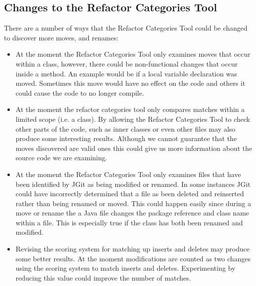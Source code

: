 \subsection{Changes to the Refactor Categories Tool}

There are a number of ways that the Refactor Categories Tool could be changed to discover more moves, and renames:

\begin{itemize}

  \item At the moment the Refactor Categories Tool only examines moves that occur within a class, however, there could be non-functional changes that occur inside a method. 
An example would be if a local variable declaration was moved.
Sometimes this move would have no effect on the code and others it could cause the code to no longer compile.
  
  \item At the moment the refactor categories tool only compares matches within a limited scope (i.e. a class).  
  By allowing the Refactor Categories Tool to check other parts of the code, such as inner classes or even other files may also produce some interesting results.
Although we cannot guarantee that the moves discovered are valid ones this could give us more information about the source code we are examining.

  \item At the moment the Refactor Categories Tool only examines files that have been identified by JGit as being modified or renamed.
In some instances JGit could have incorrectly determined that a file as been deleted and reinserted rather than being renamed or moved.
This could happen easily since during a move or rename the a Java file changes the package reference and class name within a file.
This is especially true if the class has both been renamed and modified.

  \item Revising the scoring system for matching up inserts and deletes may produce some better results.
At the moment modifications are counted as two changes using the scoring system to match inserts and deletes.
Experimenting by reducing this value could improve the number of matches.

\end{itemize}




